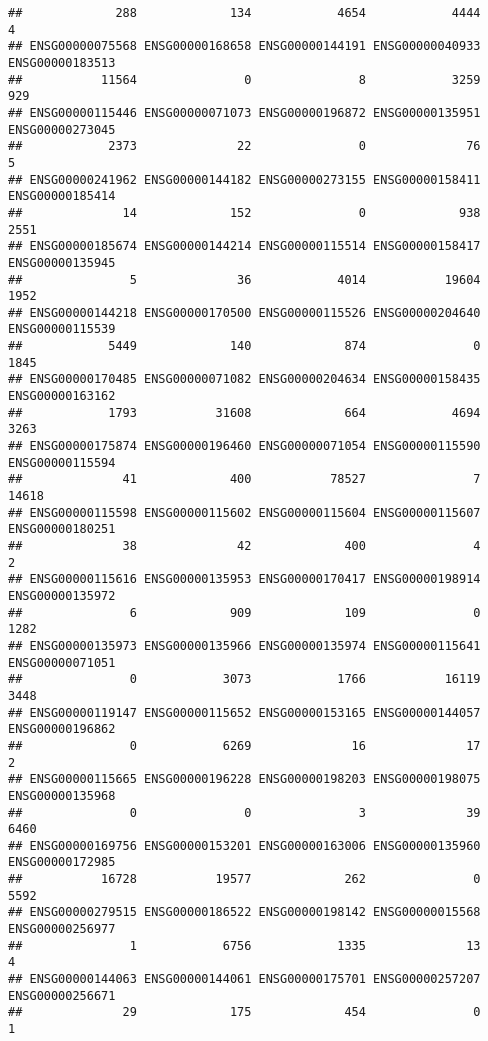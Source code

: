 \documentclass[
]{article}
\begin{document}
\begin{verbatim}
##             288             134            4654            4444               4 
## ENSG00000075568 ENSG00000168658 ENSG00000144191 ENSG00000040933 ENSG00000183513 
##           11564               0               8            3259             929 
## ENSG00000115446 ENSG00000071073 ENSG00000196872 ENSG00000135951 ENSG00000273045 
##            2373              22               0              76               5 
## ENSG00000241962 ENSG00000144182 ENSG00000273155 ENSG00000158411 ENSG00000185414 
##              14             152               0             938            2551 
## ENSG00000185674 ENSG00000144214 ENSG00000115514 ENSG00000158417 ENSG00000135945 
##               5              36            4014           19604            1952 
## ENSG00000144218 ENSG00000170500 ENSG00000115526 ENSG00000204640 ENSG00000115539 
##            5449             140             874               0            1845 
## ENSG00000170485 ENSG00000071082 ENSG00000204634 ENSG00000158435 ENSG00000163162 
##            1793           31608             664            4694            3263 
## ENSG00000175874 ENSG00000196460 ENSG00000071054 ENSG00000115590 ENSG00000115594 
##              41             400           78527               7           14618 
## ENSG00000115598 ENSG00000115602 ENSG00000115604 ENSG00000115607 ENSG00000180251 
##              38              42             400               4               2 
## ENSG00000115616 ENSG00000135953 ENSG00000170417 ENSG00000198914 ENSG00000135972 
##               6             909             109               0            1282 
## ENSG00000135973 ENSG00000135966 ENSG00000135974 ENSG00000115641 ENSG00000071051 
##               0            3073            1766           16119            3448 
## ENSG00000119147 ENSG00000115652 ENSG00000153165 ENSG00000144057 ENSG00000196862 
##               0            6269              16              17               2 
## ENSG00000115665 ENSG00000196228 ENSG00000198203 ENSG00000198075 ENSG00000135968 
##               0               0               3              39            6460 
## ENSG00000169756 ENSG00000153201 ENSG00000163006 ENSG00000135960 ENSG00000172985 
##           16728           19577             262               0            5592 
## ENSG00000279515 ENSG00000186522 ENSG00000198142 ENSG00000015568 ENSG00000256977 
##               1            6756            1335              13               4 
## ENSG00000144063 ENSG00000144061 ENSG00000175701 ENSG00000257207 ENSG00000256671 
##              29             175             454               0               1 

\end{verbatim}
\end{document}
